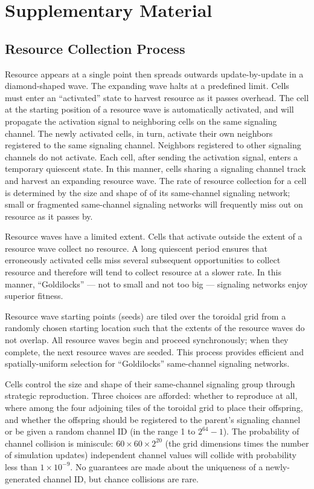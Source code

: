 \section{Supplementary Material}

\subsection{Resource Collection Process} \label{sup:resource_collection_process}

Resource appears at a single point then spreads outwards update-by-update in a diamond-shaped wave. The expanding wave halts at a predefined limit.
Cells must enter an ``activated'' state to harvest resource as it passes overhead.
The cell at the starting position of a resource wave is automatically activated, and will propagate the activation signal to neighboring cells on the same signaling channel.
The newly activated cells, in turn, activate their own neighbors registered to the same signaling channel.
Neighbors registered to other signaling channels do not activate.
Each cell, after sending the activation signal, enters a temporary quiescent state.
In this manner, cells sharing a signaling channel track and harvest an expanding resource wave.
The rate of resource collection for a cell is determined by the size and shape of of its same-channel signaling network;
small or fragmented same-channel signaling networks will frequently miss out on resource as it passes by.

Resource waves have a limited extent.
Cells that activate outside the extent of a resource wave collect no resource.
A long quiescent period ensures that erroneously activated cells miss several subsequent opportunities to collect resource and therefore will tend to collect resource at a slower rate.
In this manner, ``Goldilocks'' --- not to small and not too big --- signaling networks enjoy superior fitness.

Resource wave starting points (seeds) are tiled over the toroidal grid from a randomly chosen starting location such that the extents of the resource waves do not overlap.
All resource waves begin and proceed synchronously;
when they complete, the next resource waves are seeded.
This process provides efficient and spatially-uniform selection for ``Goldilocks'' same-channel signaling networks.

Cells control the size and shape of their same-channel signaling group through strategic reproduction.
Three choices are afforded: whether to reproduce at all, where among the four adjoining tiles of the toroidal grid to place their offspring, and whether the offspring should be registered to the parent's signaling channel or be given a random channel ID (in the range 1 to $2^{64} - 1$).
The probability of channel collision is miniscule: $60 \times 60 \times 2^{20}$ (the grid dimensions times the number of simulation updates) independent channel values will collide with probability less than $1 \times 10^{-9}$.
No guarantees are made about the uniqueness of a newly-generated channel ID, but chance collisions are rare.

